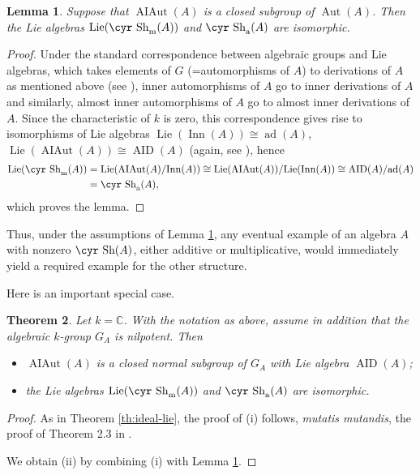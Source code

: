 \documentclass[11pt,reqno]{amsart}
\numberwithin{equation}{section}
\newtheorem{theorem}{Theorem}[section]
\newtheorem{lemma}[theorem]{Lemma}
\theoremstyle{definition}
\newcommand{\Aut}{{\operatorname{ Aut}}}
\newcommand{\Inner}{{\operatorname{ Inn}}}
\newcommand{\AIAut}{{\operatorname{ AIAut}}}
\newcommand{\AID}{{\operatorname{ AID}}}
\newcommand{\ad}{{\operatorname{ ad}}}
\newcommand{\Lie}{{\operatorname{ Lie}}}
\def\Sha{\text{\cyr Sh}}
\begin{document}
\begin{lemma} \label{lem:closed}
Suppose that $\AIAut (A)$ is a closed subgroup of $\Aut (A)$.
Then the Lie algebras $\Lie (\Sha_{\text{\rm{m}}}(A))$ and $\Sha_{\text{\rm{a}}}(A)$
are isomorphic.
\end{lemma}

\begin{proof}
Under the standard correspondence between algebraic groups and Lie algebras,
which takes elements of $G$ (=automorphisms of $A$) to derivations of $A$ as mentioned above
(see \cite[Section~10.7 and Corollary~13.2]{Hu}), inner automorphisms of $A$ go to inner
derivations of $A$ and similarly, almost inner automorphisms of $A$ go to almost inner
derivations of $A$. Since the characteristic of $k$ is zero, this correspondence gives rise
to isomorphisms of Lie algebras $\Lie(\Inner (A))\cong \ad (A)$, $\Lie(\AIAut(A))\cong \AID(A)$
(again, see \cite[Corollary~13.2]{Hu}), hence
$$
\begin{aligned}
\Lie (\Sha_{\text{\rm{m}}}(A)) & = \Lie(\AIAut(A)/\Inner(A))\cong \Lie(\AIAut(A))/\Lie(\Inner(A))
\cong \AID(A)/\ad (A)\\
&=\Sha_{\text{\rm{a}}}(A),
\end{aligned}
$$
which proves the lemma. \end{proof}

Thus, under the assumptions of Lemma \ref{lem:closed}, any eventual example of an algebra $A$ with nonzero $\Sha (A)$,
either additive or multiplicative, would immediately yield a required example for the other structure.


Here is an important special case.

\begin{theorem} \label{th:GW}
Let $k=\mathbb C$. With the notation as above, assume in addition that the algebraic $k$-group $G_A$ is nilpotent. Then
\begin{itemize}
\item[(i)] $\AIAut(A)$ is a closed normal subgroup of $G_A$ with Lie algebra $\AID (A)$;
\item[(ii)] the Lie algebras $\Lie (\Sha_{\text{\rm{m}}}(A))$ and $\Sha_{\text{\rm{a}}}(A)$
are isomorphic.
\end{itemize}
\end{theorem}

\begin{proof}
As in Theorem \ref{th:ideal-lie}, the proof of (i) follows, {\it mutatis mutandis}, the proof of Theorem 2.3 in \cite{GW}.



We obtain (ii) by combining (i) with Lemma \ref{lem:closed}.
\end{proof}
\end{document}
